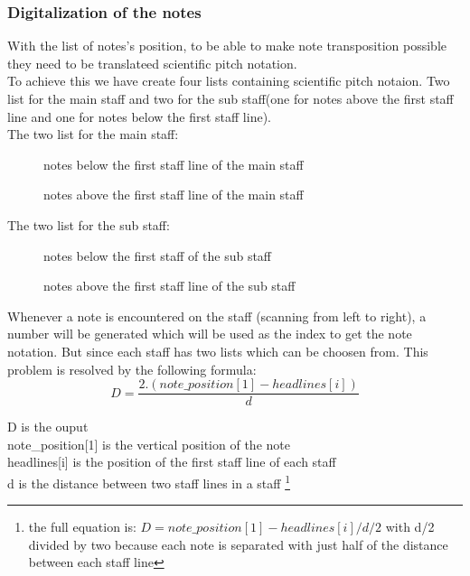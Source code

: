 \documentclass[a4paper,12pt]{report}
\begin{document}
\subsubsection{Digitalization of the notes}
With the list of notes's position, to be able to make note transposition possible
they need to be translateed scientific pitch notation.\\

To achieve this we have create four lists containing scientific pitch notaion.
Two list for the main staff and two for the sub staff(one for notes above the
first staff line and one for notes below the first staff line).\\

The two list for the main staff:
\begin{figure}[h]
\centering
\makebox[\textwidth]{['E5','D5','C5','B4','A4','G4','F4','E4','D4','C4','B3','A3','G3','F3','E3','D3','C3']}
\caption{notes below the first staff line of the main staff}
\vspace{\baselineskip}
\makebox[\textwidth]{['E5','F5','G5','A5','B5','C6','D6','E6','F6','G6']}
\caption{notes above the first staff line of the main staff}
\end{figure}

\vspace{\baselineskip}
The two list for the sub staff:
\begin{figure}[h]
\centering
\makebox[\textwidth]{['G3','F3','E3','D3','C3','B2','A2','G2','F2','E2','D2','C2','B1','A1','G1','F1','E1']}
\caption{notes below the first staff of the sub staff}
\vspace{\baselineskip}
\makebox[\textwidth]{['G3','A3','B3','C4','D4','E4','F4','G4','A4','B4']}
\caption{notes above the first staff line of the sub staff}
\end{figure}

Whenever a note is encountered on the staff (scanning from left to right), a
number will be generated which will be used as the index to get the note
notation. But since each staff has two lists which can be choosen from. This
problem is resolved by the following formula:\\

\[D = \frac{2.(note\_position[1] - headlines[i])}{d}\]

\noindent D is the ouput\\
note\_position[1] is the vertical position of the note\\
headlines[i] is the position of the first staff line of each staff\\
d is the distance between two staff lines in a staff \footnote{the 
full equation is: \(D = note\_position[1] -headlines[i] / d/2\)
with d/2 divided by two because each note is separated with just half of the distance between
each staff line}\\
\end{document}
